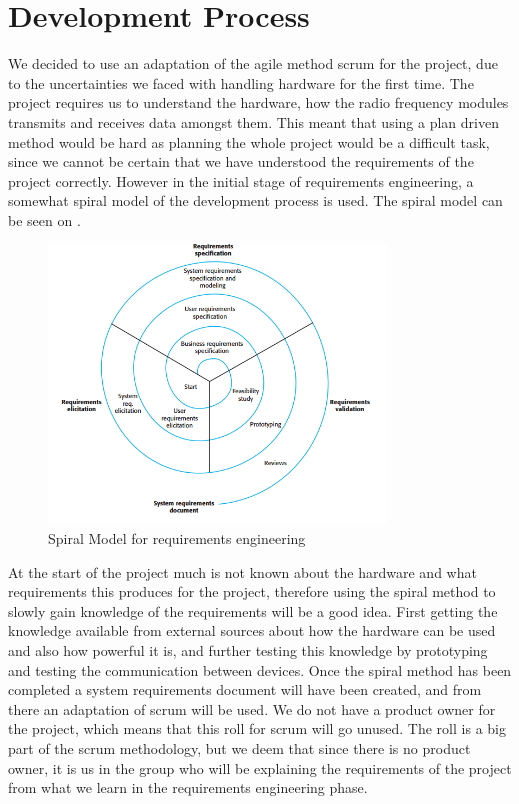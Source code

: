 \chapter{Development Process}
We decided to use an adaptation of the agile method scrum for the project, due to the uncertainties we faced with handling hardware for the first time. The project requires us to understand the hardware, how the radio frequency modules transmits and receives data amongst them. This meant that using a plan driven method would be hard as planning the whole project would be a difficult task, since we cannot be certain that we have understood the requirements of the project correctly.
However in the initial stage of requirements engineering, a somewhat spiral model of the development process is used. The spiral model can be seen on .

\begin{figure}[ht]
\centering
\includegraphics[width=0.80\textwidth]{Figures/spiral.png}
\caption{Spiral Model for requirements engineering \citep[p.112]{SOEBOOK}}\label{fig:spiralDiagram}
\end{figure}

At the start of the project much is not known about the hardware and what requirements this produces for the project, therefore using the spiral method to slowly gain knowledge of the requirements will be a good idea. First getting the knowledge available from external sources about how the hardware can be used and also how powerful it is, and further testing this knowledge by prototyping and testing the communication between devices. 
Once the spiral method has been completed a system requirements document will have been created, and from there an adaptation of scrum will be used.
We do not have a product owner for the project, which means that this roll for scrum will go unused. The roll is a big part of the scrum methodology, but we deem that since there is no product owner, it is us in the group who will be explaining the requirements of the project from what we learn in the requirements engineering phase. 

